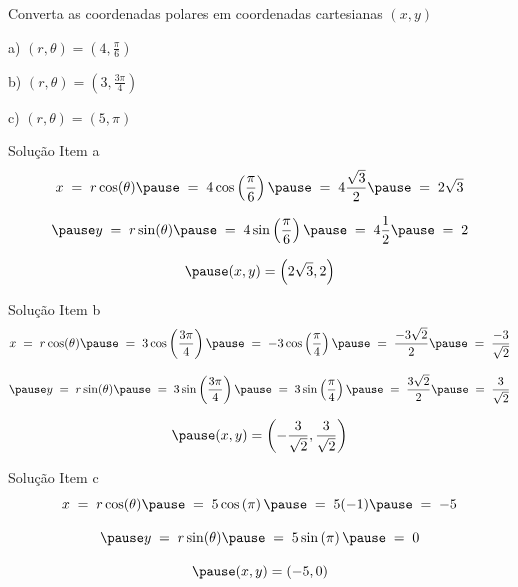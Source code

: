 \begin{question}
  Converta as coordenadas polares em coordenadas cartesianas $(x, y)$

  a) \quad \((r, \theta) = \left( 4, \frac{ \pi}{6} \right) \)

  b) \quad \((r, \theta) = \left( 3, \frac{3\pi}{4} \right) \)

  c) \quad \((r, \theta) = \left( 5, \pi            \right) \)
\end{question}

\begin{resolution}{Solução Item a}
  \[
    x      \;=\; r \cos(\theta)
    \pause \;=\; 4 \cos\left(\frac{\pi}{6}\right)
    \pause \;=\; 4 \frac{\sqrt{3}}{2}
    \pause \;=\; 2 \sqrt{3}
  \]

  \[
    \pause y \;=\; r \sin(\theta)
    \pause   \;=\; 4 \sin\left(\frac{\pi}{6}\right)
    \pause   \;=\; 4 \frac{1}{2}
    \pause   \;=\; 2
  \]

  \[
    \pause (x, y) = \left( 2 \sqrt{3}, 2 \right)
  \]
\end{resolution}

\begin{resolution}{Solução Item b}
  \[
    x      \;=\; r \cos(\theta)
    \pause \;=\; 3 \cos\left(\frac{3\pi}{4}\right)
    \pause \;=\; -3 \cos\left(\frac{\pi}{4}\right)
    \pause \;=\; \frac{-3\sqrt{2}}{2}
    \pause \;=\; \frac{-3}{\sqrt{2}}
  \]

  \[
    \pause y \;=\; r \sin(\theta)
    \pause   \;=\; 3 \sin\left(\frac{3\pi}{4}\right)
    \pause   \;=\; 3 \sin\left(\frac{\pi}{4}\right)
    \pause   \;=\; \frac{3\sqrt{2}}{2}
    \pause \;=\; \frac{3}{\sqrt{2}}
  \]

  \[
    \pause (x, y) = \left(-\frac{3}{\sqrt{2}}, \frac{3}{\sqrt{2}}\right)
  \]
\end{resolution}

\begin{resolution}{Solução Item c}
  \[
    x      \;=\; r \cos(\theta)
    \pause \;=\; 5 \cos\left(\pi\right)
    \pause \;=\; 5(-1)
    \pause \;=\; -5
  \]

  \[
    \pause y \;=\; r \sin(\theta)
    \pause   \;=\; 5 \sin\left(\pi\right)
    \pause   \;=\; 0
  \]

  \[
    \pause (x, y) = (-5, 0)
  \]
\end{resolution}

